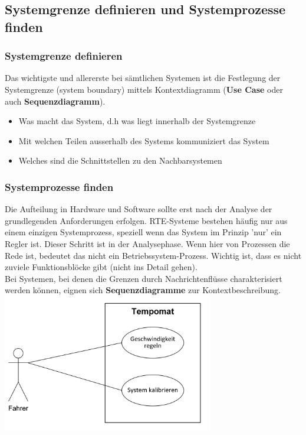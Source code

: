 \subsection{Systemgrenze definieren und Systemprozesse finden}
\subsubsection{Systemgrenze definieren}
Das wichtigste und allererste bei sämtlichen Systemen ist die Festlegung der Systemgrenze (system boundary) mittels Kontextdiagramm (\textbf{Use Case} oder auch \textbf{Sequenzdiagramm}).
\begin{itemize}
	\item Was macht das System, d.h was liegt innerhalb der Systemgrenze
	\item Mit welchen Teilen ausserhalb des Systems kommuniziert das System
	\item Welches sind die Schnittstellen zu den Nachbarsystemen
\end{itemize}

\subsubsection{Systemprozesse finden}
\begin{multicols}{2}
	Die Aufteilung in Hardware und Software sollte erst nach der Analyse der grundlegenden Anforderungen erfolgen. RTE-Systeme bestehen häufig nur aus einem einzigen Systemprozess, speziell wenn das System im Prinzip 'nur' ein Regler ist. Dieser Schritt ist in der Analysephase. Wenn hier von Prozessen die Rede ist, bedeutet das nicht ein Betriebssystem-Prozess. Wichtig ist, dass es nicht zuviele Funktionsblöcke gibt (nicht ins Detail gehen). \\
	Bei Systemen, bei denen die Grenzen durch Nachrichtenflüsse charakterisiert werden können, eignen sich \textbf{Sequenzdiagramme} zur Kontextbeschreibung.\\
	\vfill\null
	\columnbreak
	\includegraphics[height=6cm]{images/Modellierung/Systemgrenze}
\end{multicols}

